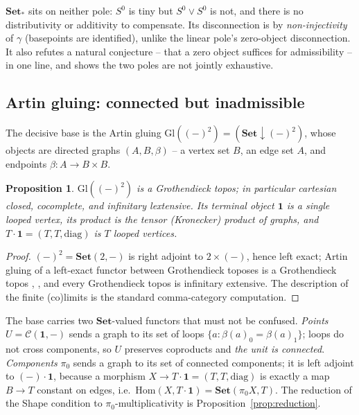 \documentclass[11pt]{amsart}
\theoremstyle{plain}
\newtheorem{proposition}[theorem]{Proposition}
\theoremstyle{definition}
\newcommand{\C}{\mathcal{C}}
\newcommand{\Setb}{\mathbf{Set}}
\newcommand{\Gl}{\mathrm{Gl}}
\newcommand{\Hom}{\mathrm{Hom}}
\newcommand{\one}{\mathbf{1}}
\newcommand{\pizero}{\pi_0}
\begin{document}
$\Setb_*$ sits on neither pole: $S^0$ is tiny but $S^0\vee S^0$ is not, and there is no
distributivity or additivity to compensate. Its disconnection is by \emph{non-injectivity} of
$\gamma$ (basepoints are identified), unlike the linear pole's zero-object disconnection. It also
refutes a natural conjecture -- that a zero object suffices for admissibility -- in one line, and
shows the two poles are not jointly exhaustive.

\subsection{Artin gluing: connected but inadmissible}\label{sub:gluing}
The decisive base is the Artin gluing $\Gl((-)^2)=(\Setb\downarrow(-)^2)$, whose objects are directed
graphs $(A,B,\beta)$ -- a vertex set $B$, an edge set $A$, and endpoints $\beta:A\to B\times B$.

\begin{proposition}\label{prop:gl-topos}
$\Gl((-)^2)$ is a Grothendieck topos; in particular cartesian closed, cocomplete, and infinitary
lextensive. Its terminal object $\one$ is a single looped vertex, its product is the tensor
(Kronecker) product of graphs, and $T\cdot\one=(T,T,\mathrm{diag})$ is $T$ looped vertices.
\end{proposition}
\begin{proof}
$(-)^2=\Setb(2,-)$ is right adjoint to $2\times(-)$, hence left exact; Artin gluing of a left-exact
functor between Grothendieck toposes is a Grothendieck topos \cite[A2.1.12]{MacLaneMoerdijk},
\cite{CarboniJohnstone}, and every Grothendieck topos is infinitary extensive. The description of the
finite (co)limits is the standard comma-category computation.
\end{proof}

The base carries two $\Setb$-valued functors that must not be confused. \emph{Points}
$U=\C(\one,-)$ sends a graph to its set of loops $\{a:\beta(a)_0=\beta(a)_1\}$; loops do not cross
components, so $U$ preserves coproducts and \emph{the unit is connected}. \emph{Components}
$\pizero$ sends a graph to its set of connected components; it is left adjoint to $(-)\cdot\one$,
because a morphism $X\to T\cdot\one=(T,T,\mathrm{diag})$ is exactly a map $B\to T$ constant on edges,
i.e.\ $\Hom(X,T\cdot\one)=\Setb(\pizero X,T)$. The reduction of the Shape condition to
$\pizero$-multiplicativity is Proposition~\ref{prop:reduction}.
\end{document}
